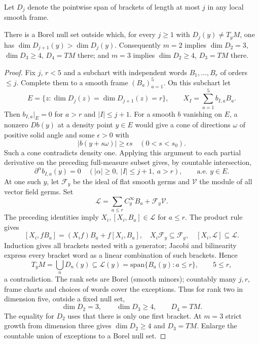 Let $D_j$ denote the pointwise span of brackets of length at most
$j$ in any local smooth frame.
\begin{lemma}\label{regular-growth}
There is a Borel null set outside which, for every $j\ge1$ with
$D_j(y)\ne T_yM$, one has $\dim D_{j+1}(y)>\dim D_j(y)$.
Consequently $m=2$ implies $\dim D_2=3$, $\dim D_3\ge4$, $D_4=TM$
there; and $m=3$ implies $\dim D_2\ge4$, $D_3=TM$ there.
\end{lemma}
\begin{proof}
Fix $j$, $r<5$ and a subchart with independent words
$B_1,\ldots,B_r$ of orders $\le j$. Complete them to a smooth frame
$(B_a)_{a=1}^5$. On this subchart let
\[
 E=\{z:\dim D_j(z)=\dim D_{j+1}(z)=r\},\qquad
 X_I=\sum_{a=1}^5 b_{I,a}B_a .
\]
Then $b_{I,a}|_E=0$ for $a>r$ and $|I|\le j+1$. For a smooth $b$ vanishing
on $E$, a nonzero $Db(y)$ at a density point $y\in E$ would give a cone of
directions $\omega$ of positive solid angle and some $\epsilon>0$ with
\[
 |b(y+s\omega)|\ge \epsilon s\quad(0<s<s_0).
\]
Such a cone contradicts density one. Applying this argument to each partial
derivative on the preceding full-measure subset gives, by countable intersection,
\[
 \partial^\alpha b_{I,a}(y)=0\quad
 (|\alpha|\ge0,\ |I|\le j+1,\ a>r),\qquad\text{a.e. }y\in E .
\]
At one such $y$, let $\mathcal F_y$ be the ideal of flat smooth germs and
$\mathcal V$ the module of all vector field germs. Set
\[
 \mathcal L=\sum_{a\le r} C^\infty_y B_a+\mathcal F_y\mathcal V.
\]
The preceding identities imply $X_i,[X_i,B_a]\in\mathcal L$ for $a\le r$.
The product rule gives
\[
 [X_i,fB_a]=(X_i f)B_a+f[X_i,B_a],\quad
 X_i\mathcal F_y\subseteq\mathcal F_y,\quad
 [X_i,\mathcal L]\subseteq\mathcal L .
\]
Induction gives all brackets nested with a generator; Jacobi and bilinearity
express every bracket word as a linear combination of such brackets. Hence
\[
 T_yM=\bigcup_nD_n(y)\subseteq\mathcal L(y)
       =\mathrm{span}\{B_a(y):a\le r\},\qquad 5\le r ,
\]
a contradiction. The rank sets are Borel (smooth minors); countably many
$j,r$, frame charts and choices of words cover the exceptions.
Thus for rank two in dimension five, outside a fixed null set,
\[
       \dim D_2=3,\qquad \dim D_3\ge4,\qquad D_4=TM.       \tag{G}\label{growth}
\]
The equality for $D_2$ uses that there is only one first bracket.
At $m=3$ strict growth from dimension three gives $\dim D_2\ge4$
and $D_3=TM$. Enlarge the countable union of exceptions to a Borel null set.
\end{proof}
